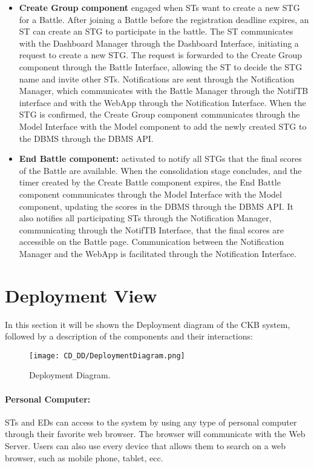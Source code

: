 \begin{itemize}
    \item \textbf{Create Group component} engaged when STs want to create a new STG for a Battle. After joining a Battle before the registration deadline expires, an ST can create an STG to participate in the battle. The ST communicates with the Dashboard Manager through the Dashboard Interface, initiating a request to create a new STG. The request is forwarded to the Create Group component through the Battle Interface, allowing the ST to decide the STG name and invite other STs. Notifications are sent through the Notification Manager, which communicates with the Battle Manager through the NotifTB interface and with the WebApp through the Notification Interface. When the STG is confirmed, the Create Group component communicates through the Model Interface with the Model component to add the newly created STG to the DBMS through the DBMS API.
    \item \textbf{End Battle component:} activated to notify all STGs that the final scores of the Battle are available. When the consolidation stage concludes, and the timer created by the Create Battle component expires, the End Battle component communicates through the Model Interface with the Model component, updating the scores in the DBMS through the DBMS API. It also notifies all participating STs through the Notification Manager, communicating through the NotifTB Interface, that the final scores are accessible on the Battle page. Communication between the Notification Manager and the WebApp is facilitated through the Notification Interface.
\end{itemize}


\section{Deployment View}
\label{sec:deployment_view}%

In this section it will be shown the Deployment diagram of the CKB system, followed by a description of the components and their interactions:
\begin{figure}[H]
    \begin{center}
        \texttt{[image: CD\_DD/DeploymentDiagram.png]}
        \caption{Deployment Diagram.}
        \label{fig:Deployment_Diagram}%
    \end{center}
\end{figure}

\paragraph{Personal Computer:}
STs and EDs can access to the system by using any type of personal computer through their favorite web browser. The browser will communicate with the Web Server. Users can also use every device that allows them to search on a web browser, such as mobile phone, tablet, ecc.

